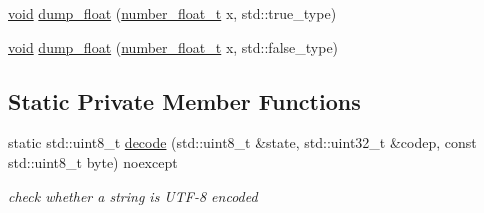 \begin{DoxyCompactItemize}
\mbox{\hyperlink{namespacenlohmann_1_1detail_a59fca69799f6b9e366710cb9043aa77d}{void}} \mbox{\hyperlink{classnlohmann_1_1detail_1_1serializer_a24b0fe45dc774441237bde198a133d8a}{dump\+\_\+float}} (\mbox{\hyperlink{classnlohmann_1_1detail_1_1serializer_a460c6794fbabbb2ae83380e987a6c030}{number\+\_\+float\+\_\+t}} x, std\+::true\+\_\+type)
\item 
\mbox{\hyperlink{namespacenlohmann_1_1detail_a59fca69799f6b9e366710cb9043aa77d}{void}} \mbox{\hyperlink{classnlohmann_1_1detail_1_1serializer_a331dad892fc00313f928fdaa6bc8f849}{dump\+\_\+float}} (\mbox{\hyperlink{classnlohmann_1_1detail_1_1serializer_a460c6794fbabbb2ae83380e987a6c030}{number\+\_\+float\+\_\+t}} x, std\+::false\+\_\+type)
\end{DoxyCompactItemize}
\subsection*{Static Private Member Functions}
\begin{DoxyCompactItemize}
\item 
static std\+::uint8\+\_\+t \mbox{\hyperlink{classnlohmann_1_1detail_1_1serializer_abdcc4fd1dc5d3afb6c0817e4c89b1242}{decode}} (std\+::uint8\+\_\+t \&state, std\+::uint32\+\_\+t \&codep, const std\+::uint8\+\_\+t byte) noexcept
\begin{DoxyCompactList}\small\item\em check whether a string is U\+T\+F-\/8 encoded \end{DoxyCompactList}\end{DoxyCompactItemize}
